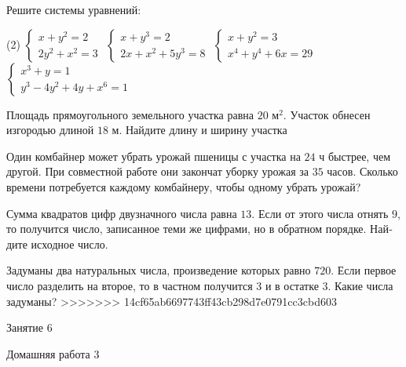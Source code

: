 \begin{class}[number=5]
\begin{listofex}
		\item Решите системы уравнений:
		\begin{tasks}(2)
			\task \( \begin{cases} x+y^2=2 \\ 2y^2+x^2=3 \end{cases} \)
			\task \( \begin{cases} x+y^3=2 \\ 2x+x^2+5y^3=8 \end{cases} \)
			\task \( \begin{cases} x+y^2=3 \\ x^4+y^4+6x=29 \end{cases} \)
			\task \( \begin{cases} x^3+y=1 \\ y^3-4y^2+4y+x^6=1 \end{cases} \)
		\end{tasks}
		\item Площадь прямоугольного земельного участка равна \(20\) м\(^2\). Участок обнесен изгородью длиной \(18\) м. Найдите длину и ширину участка
		\item Один комбайнер может убрать урожай пшеницы с участка на \(24\) ч быстрее, чем другой. При совместной работе они закончат уборку урожая за \(35\) часов. Сколько времени потребуется каждому комбайнеру, чтобы одному убрать урожай?
		\item Сумма квад­ра­тов цифр дву­знач­но­го числа равна \(13\). Если от этого числа от­нять \(9\), то по­лу­чит­ся число, за­пи­сан­ное теми же циф­ра­ми, но в об­рат­ном по­ряд­ке. Най­ди­те ис­ход­ное число.
		\item За­ду­ма­ны два на­ту­раль­ных числа, про­из­ве­де­ние ко­то­рых равно \(720\). Если пер­вое число раз­де­лить на вто­рое, то в част­ном по­лу­чит­ся \(3\) и в остат­ке \(3\). Какие числа за­ду­ма­ны?
>>>>>>> 14cf65ab6697743ff43cb298d7e0791cc3cbd603
	\end{listofex}
\end{class}

\begin{class}[number=6]
	\begin{listofex}
		\item Занятие 6
	\end{listofex}
\end{class}

\begin{homework}[number=3]
	\begin{listofex}
		\item Домашняя работа 3
	\end{listofex}
\end{homework}

